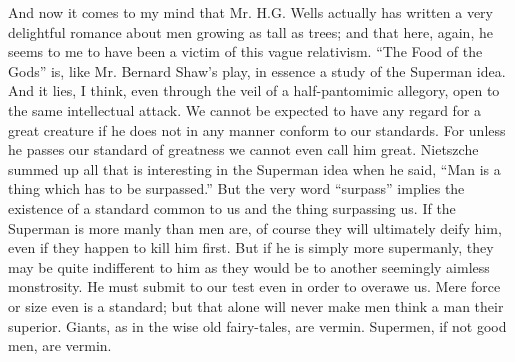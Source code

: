 And now it comes to my mind that Mr. H.G. Wells actually has written a very delightful romance about men growing as tall as trees; and that here, again, he seems to me to have been a victim of this vague relativism. “The Food of the Gods” is, like Mr. Bernard Shaw’s play, in essence a study of the Superman idea. And it lies, I think, even through the veil of a half-pantomimic allegory, open to the same intellectual attack. We cannot be expected to have any regard for a great creature if he does not in any manner conform to our standards. For unless he passes our standard of greatness we cannot even call him great. Nietszche summed up all that is interesting in the Superman idea when he said, “Man is a thing which has to be surpassed.” But the very word “surpass” implies the existence of a standard common to us and the thing surpassing us. If the Superman is more manly than men are, of course they will ultimately deify him, even if they happen to kill him first. But if he is simply more supermanly, they may be quite indifferent to him as they would be to another seemingly aimless monstrosity. He must submit to our test even in order to overawe us. Mere force or size even is a standard; but that alone will never make men think a man their superior. Giants, as in the wise old fairy-tales, are vermin. Supermen, if not good men, are vermin.

